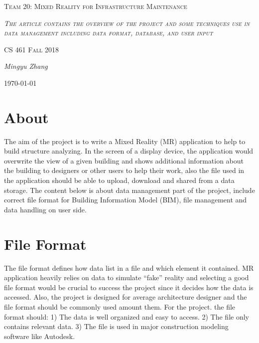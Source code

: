 \documentclass[10pt,letter paper]{article}
\begin{document}
\begin{titlepage}
	\centering
	\vspace{8cm}
	{\scshape\huge Team 20: Mixed Reality for Infrastructure Maintenance \par}
	\vspace{2cm}
	{\scshape\itshape The article contains the overview of the project and some techniques use in data management including data format, database, and user input\par}
	\vspace{1.5cm}
	{\scshape\Large CS 461 Fall 2018\par}
	\vspace{1.5cm}
	{\Large\itshape Mingyu Zhang\par}
	\vspace{1.5cm}


	{\large \today\par}
\end{titlepage}

\section*{About } 
The aim of the project is to write a Mixed Reality (MR) application to help to build structure analyzing. In the screen of a display device, the application would overwrite the view of a given building and shows additional information about the building to designers or other users to help their work, also the file used in the application should be able to upload, download and shared from a data storage. \newline
\noindent
\newline
The content below is about data management part of the project, include correct file format for Building Information Model (BIM), file management and data handling on user side.

\section{File Format}
The file format defines how data list in a file and which element it contained.  MR application heavily relies on data to simulate “fake” reality and selecting a good file format would be crucial to success the project since it decides how the data is accessed. Also, the project is designed for average architecture designer and the file format should be commonly used amount them. \newline
\noindent
\newline
For the project. the file format should: 1) The data is well organized and easy to access. 2) The file only contains relevant data. 3) The file is used in major construction modeling software like Autodesk. 
\end{document}
